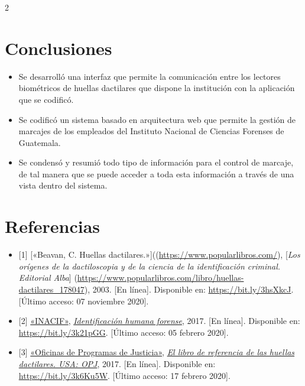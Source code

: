 \documentclass[12pt,spanish,Letterpaper,openany]{book}
\providecommand{\tightlist}{%
  \setlength{\itemsep}{0pt}\setlength{\parskip}{0pt}}
\begin{document}
\begin {multicols}{2}

\hypertarget{conclusiones-4}{%
\section{Conclusiones}\label{conclusiones-4}}

\begin{itemize}
\tightlist
\item
  Se desarrolló una interfaz que permite la comunicación entre los lectores biométricos de huellas dactilares que dispone la institución con la aplicación que se codificó.
\item
  Se codificó un sistema basado en arquitectura web que permite la gestión de marcajes de los empleados del Instituto Nacional de Ciencias Forenses de Guatemala.
\item
  Se condensó y resumió todo tipo de información para el control de marcaje, de tal manera que se puede acceder a toda esta información a través de una vista dentro del sistema.
\end{itemize}

\hypertarget{referencias-5}{%
\section{Referencias}\label{referencias-5}}

\begin{itemize}
\item
  {[}1{]} {[}«Beavan, C. Huellas dactilares.»{]}((\url{https://www.popularlibros.com/}), {[}\emph{Los orígenes de la dactiloscopia y de la ciencia
  de la identificación criminal. Editorial Alba}{]}
  (\url{https://www.popularlibros.com/libro/huellas-dactilares_178047}), 2003. {[}En línea{]}. Disponible en: \url{https://bit.ly/3hsXkcJ}. {[}Último acceso: 07 noviembre 2020{]}.
\item
  {[}2{]} \href{https://nij.ojp.gov/}{«INACIF»}, \href{https://www.inacif.gob.gt/index.php/servicios/k2-blog/item/31-la-identificacion-humana-forense}{\emph{Identificación humana forense}}, 2017. {[}En línea{]}. Disponible en: \url{https://bit.ly/3k21pGG}. {[}Último acceso: 05 febrero 2020{]}.
\item
  {[}3{]} \href{https://nij.ojp.gov/}{«Oficinas de Programas de Justicia»}, \href{https://nij.ojp.gov/library/publications/el-libro-de-referencia-de-las-huellas-dactilares}{\emph{El libro de referencia de las huellas dactilares. USA: OPJ}}, 2017. {[}En línea{]}. Disponible en: \url{https://bit.ly/3k6Ku5W}. {[}Último acceso: 17 febrero 2020{]}.
\end{itemize}

\end {multicols}
\end{document}
